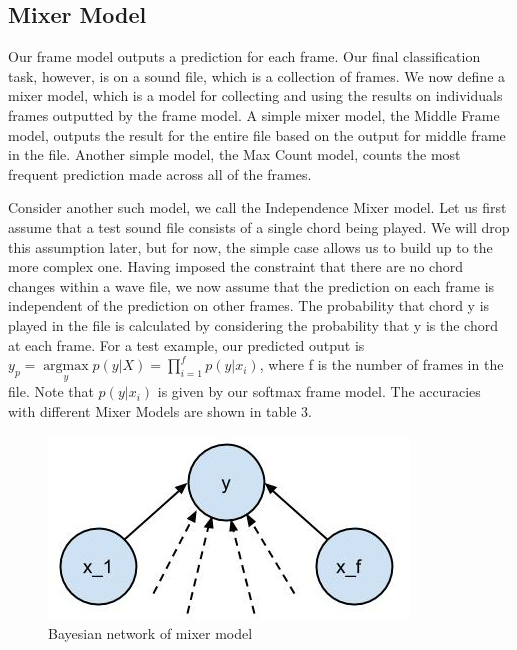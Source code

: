 \documentclass{article}
\begin{document}
\subsection{Mixer Model}
Our frame model outputs a prediction for each frame. Our final classification task, however, is on a sound file, which is a collection of frames. We now define a mixer model, which is a model for collecting and using the results on individuals frames outputted by the frame model. A simple mixer model, the Middle Frame model, outputs the result for the entire file based on the output for middle frame in the file. Another simple model, the Max Count model, counts the most frequent prediction made across all of the frames.

Consider another such model, we call the Independence Mixer model. Let us first assume that a test sound file consists of a single chord being played. We will drop this assumption later, but for now, the simple case allows us to build up to the more complex one. Having imposed the constraint that there are no chord changes within a wave file, we now assume that the prediction on each frame is independent of the prediction on other frames. The probability that chord y is played in the file is calculated by considering the probability that y is the chord at each frame.  For a test example, our predicted output is $y_p = \underset{y}{\operatorname{argmax}} p(y | X) = \prod_{i=1}^fp(y | x_i)$, where f is the number of frames in the file. Note that $p(y | x_i)$ is given by our softmax frame model. The accuracies with different Mixer Models are shown in table 3.
\begin{figure}[ht]
\vskip 0.2in
\begin{center}
\centerline{\includegraphics[width=\columnwidth]{f1}}
\caption{Bayesian network of mixer model}
\label{icml-historical}
\end{center}
\vskip -0.2in
\end{figure}
\end{document}
